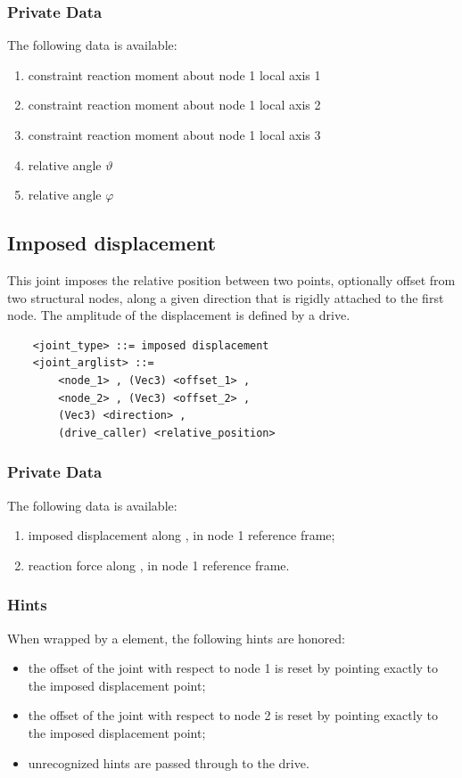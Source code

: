 \subsubsection{Private Data}
The following data is available:
\begin{enumerate}
\item {} constraint reaction moment about node 1 local axis 1
\item {} constraint reaction moment about node 1 local axis 2
\item {} constraint reaction moment about node 1 local axis 3
\item {} relative angle $\vartheta$
\item {} relative angle $\varphi$
\end{enumerate}



\subsection{Imposed displacement}
\label{sec:EL:JOINT:IMPOSEDDISPLACEMENT}
This joint imposes the relative position between two points,
optionally offset from two structural nodes,
along a given direction that is rigidly attached to the first node.
The amplitude of the displacement is defined by a drive.
\begin{verbatim}
    <joint_type> ::= imposed displacement
    <joint_arglist> ::= 
        <node_1> , (Vec3) <offset_1> ,
        <node_2> , (Vec3) <offset_2> ,
        (Vec3) <direction> ,
        (drive_caller) <relative_position>
\end{verbatim}

\subsubsection{Private Data}
The following data is available:
\begin{enumerate}
\item {} imposed displacement along ,
in node 1 reference frame;
\item {} reaction force along ,
in node 1 reference frame.
\end{enumerate}

\subsubsection{Hints}
When wrapped by a  element, the following hints are honored:
\begin{itemize}
\item {} the offset of the joint
with respect to node 1 is reset by pointing exactly
to the imposed displacement point;
\item {} the offset of the joint
with respect to node 2 is reset by pointing exactly
to the imposed displacement point;
\item unrecognized hints are passed through to the drive.
\end{itemize}



